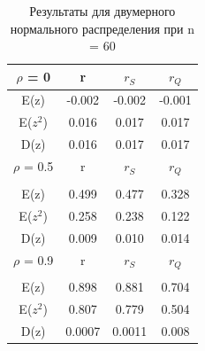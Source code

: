 \documentclass[a4]{article}
\begin{document}
		\begin{table}[h!]
			
			\caption{Результаты для двумерного нормального распределения при  n = 60}
			\label{tab:my_label}
			\begin{center}
				\vspace{5mm}
				\begin{tabular}{|c|c|c|c}
					\hline
					$\rho$ = 0 & r & $r_S$ & $r_Q$ \\
					\hline
					E(z) & -0.002 & -0.002 & -0.001\\
					\hline
					E($z^2$)   & 0.016 & 0.017 & 0.017\\
					\hline
					D(z)   & 0.016 & 0.017 & 0.017 \\
					\hline
					$\rho$ = 0.5 & r & $r_S$ & $r_Q$ \\
					\hline\\
					\hline
					E(z) & 0.499 & 0.477 & 0.328\\
					\hline
					E($z^2$)   & 0.258 & 0.238 & 0.122\\
					\hline
					D(z)   & 0.009 & 0.010 & 0.014 \\
					\hline
					$\rho$ = 0.9 & r & $r_S$ & $r_Q$ \\
					\hline\\
					\hline
					E(z) & 0.898 & 0.881 & 0.704\\
					\hline
					E($z^2$)   & 0.807 & 0.779 & 0.504\\
					\hline
					D(z)   & 0.0007 & 0.0011 & 0.008 \\
					\hline
				\end{tabular}
				
			\end{center}
			
		\end{table}
		\newpage
\end{document}
